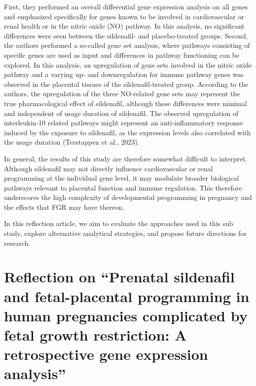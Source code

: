 \documentclass[authordate, reflection]{jote-new-article}
\begin{document}
	First, they performed an overall differential gene expression analysis on all genes and emphasized specifically for genes known to be involved in cardiovascular or renal health or in the nitric oxide (NO) pathway. In this analysis, no significant differences were seen between the sildenafil- and placebo-treated groups. Second, the authors performed a so-called gene set analysis, where pathways consisting of specific genes are used as input and differences in pathway functioning can be explored. In this analysis, an upregulation of gene sets involved in the nitric oxide pathway and a varying up- and downregulation for immune pathway genes was observed in the placental tissues of the sildenafil-treated group. According to the authors, the upregulation of the three NO-related gene sets may represent the true pharmacological effect of sildenafil, although these differences were minimal and independent of usage duration of sildenafil. The observed upregulation of interleukin-10 related pathways might represent an anti-inflammatory response induced by the exposure to sildenafil, as the expression levels also correlated with the usage duration (Terstappen et al., 2023).



	In general, the results of this study are therefore somewhat difficult to interpret. Although sildenafil may not directly influence cardiovascular or renal programming at the individual gene level, it may modulate broader biological pathways relevant to placental function and immune regulation. This therefore underscores the high complexity of developmental programming in pregnancy and the effects that FGR may have thereon.



	In this reflection article, we aim to evaluate the approaches used in this sub study, explore alternative analytical strategies, and propose future directions for research.







	\section{Reflection on “Prenatal sildenafil and fetal-placental programming in human pregnancies complicated by fetal growth restriction: A retrospective gene expression analysis”}
\end{document}
